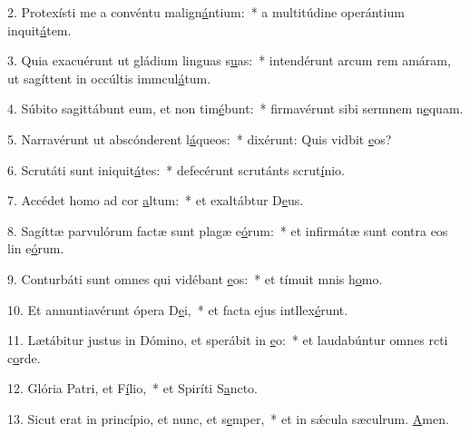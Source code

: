 2. Protexísti me a convéntu malign\uline{á}ntium:~* a multitúdine operántium inquit\uline{á}tem.\par 
3. Quia exacuérunt ut gládium linguas s\uline{u}as:~* intendérunt arcum rem amáram, ut sagíttent in occúltis immcul\uline{á}tum.\par 
4. Súbito sagittábunt eum, et non tim\uline{é}bunt:~* firmavérunt sibi sermnem n\uline{e}quam.\par 
5. Narravérunt ut abscónderent l\uline{á}queos:~* dixérunt: Quis vidbit \uline{e}os?\par 
6. Scrutáti sunt iniquit\uline{á}tes:~* defecérunt scrutánts scrut\uline{í}nio.\par 
7. Accédet homo ad cor \uline{a}ltum:~* et exaltábtur D\uline{e}us.\par 
8. Sagíttæ parvulórum factæ sunt plagæ e\uline{ó}rum:~* et infirmátæ sunt contra eos lin e\uline{ó}rum.\par 
9. Conturbáti sunt omnes qui vidébant \uline{e}os:~* et tímuit mnis h\uline{o}mo.\par 
10. Et annuntiavérunt ópera D\uline{e}i,~* et facta ejus intllex\uline{é}runt.\par 
11. Lætábitur justus in Dómino, et sperábit in \uline{e}o:~* et laudabúntur omnes rcti c\uline{o}rde.\par 
12. Glória Patri, et F\uline{í}lio,~* et Spiríti S\uline{a}ncto.\par 
13. Sicut erat in princípio, et nunc, et s\uline{e}mper,~* et in sǽcula sæculrum. \uline{A}men.\par 
